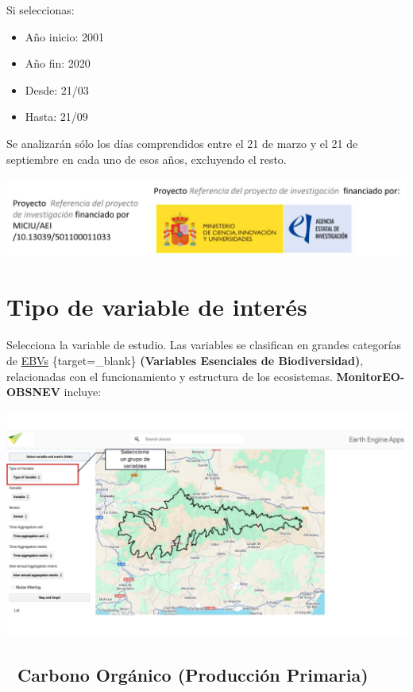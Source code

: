 \documentclass[
]{book}
\providecommand{\tightlist}{%
  \setlength{\itemsep}{0pt}\setlength{\parskip}{0pt}}
\begin{document}
Si seleccionas:

\begin{itemize}
\tightlist
\item
  Año inicio: 2001\\
\item
  Año fin: 2020\\
\item
  Desde: 21/03\\
\item
  Hasta: 21/09
\end{itemize}

Se analizarán sólo los días comprendidos entre el 21 de marzo y el 21 de septiembre en cada uno de esos años, excluyendo el resto.

\includegraphics{assets/logo.jpeg}

\chapter{Tipo de variable de interés}\label{tipo-variable}

Selecciona la variable de estudio. Las variables se clasifican en grandes categorías de \href{https://geobon.org/ebvs/what-are-ebvs/}{EBVs} \{target=\_blank\} \textbf{(Variables Esenciales de Biodiversidad)}, relacionadas con el funcionamiento y estructura de los ecosistemas. \textbf{MonitorEO-OBSNEV} incluye:

\includegraphics{assets/variables_es.png}

\section{\texorpdfstring{\textbf{🌱 Carbono Orgánico (Producción Primaria)}}{🌱 Carbono Orgánico (Producción Primaria)}}\label{carbono-orguxe1nico-producciuxf3n-primaria}
\end{document}
